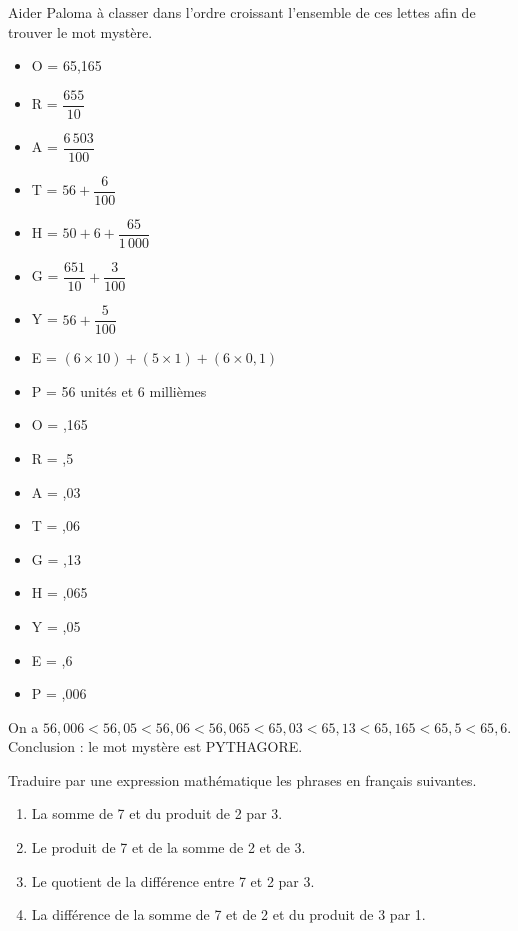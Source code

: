\documentclass[nocrop]{sesamanuel_college_5e_new}
\begin{document}
\begin{colonne*exercice}
\bigskip


\begin{exercice} %
   Aider Paloma à classer dans l'ordre croissant l'ensemble de ces lettes afin de trouver le mot mystère. \smallskip
   \begin{itemize}
      \item O = 65,165 \medskip
      \item R = $\dfrac{655}{10}$ \medskip
      \item A = $\dfrac{6\,503}{100}$ \medskip
      \item T = $56+\dfrac{6}{100}$ \medskip
      \item H = $50+6+\dfrac{65}{1\,000}$ \medskip
      \item G = $\dfrac{651}{10}+\dfrac{3}{100}$ \medskip
      \item Y = $56+\dfrac{5}{100}$ \medskip
      \item E = $(6\times10)+(5\times1)+(6\times0,1)$ \smallskip
      \item P = 56 unités et 6 millièmes
   \end{itemize}
\end{exercice}

\begin{corrige}
   \begin{itemize}
      \item O = ,165
      \item R = ,5
      \item A = ,03
      \item T = ,06
      \item G = ,13
      \item H = ,065
      \item Y = ,05
      \item E = ,6
      \item P = ,006
   \end{itemize}
   On a {\blue $56,006 < 56,05 < 56,06 < 56,065 < 65,03 < 65,13 < 65,165 < 65,5 < 65,6$}. \\
   Conclusion : le mot mystère est \blue PYTHAGORE. \\
\end{corrige}

\bigskip


\begin{exercice}%
   Traduire par une expression mathématique les phrases en français suivantes.
   \begin{enumerate}
      \item La somme de 7 et du produit de 2 par 3.
      \item Le produit de 7 et de la somme de 2 et de 3.
      \item Le quotient de la différence entre 7 et 2 par 3.
      \item La différence de la somme de 7 et de 2 et du produit de 3 par 1.
   \end{enumerate}
\end{exercice}


\end{colonne*exercice}
\end{document}

